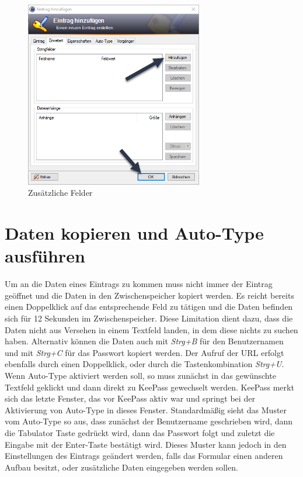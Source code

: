 \documentclass[12pt,a4paper]{scrreprt}
\begin{document}
\begin{figure}[h]
\begin{center}
\includegraphics[width=220pt]{media/knewentry4.png}
\caption{Zusätzliche Felder}
\label{knewentry4}
\end{center}
\end{figure}

\newpage

\section{Daten kopieren und Auto-Type ausführen}
Um an die Daten eines Eintrags zu kommen muss nicht immer der Eintrag geöffnet und die Daten in den Zwischenspeicher kopiert werden. Es reicht bereits einen Doppelklick auf das entsprechende Feld zu tätigen und die Daten befinden sich für 12 Sekunden im Zwischenspeicher. Diese Limitation dient dazu, dass die Daten nicht aus Versehen in einem Textfeld landen, in dem diese nichts zu suchen haben. Alternativ können die Daten auch mit \textit{Strg+B} für den Benutzernamen und mit \textit{Strg+C} für das Passwort kopiert werden. Der Aufruf der URL erfolgt ebenfalls durch einen Doppelklick, oder durch die Tastenkombination \textit{Strg+U}.\\

\noindent Wenn Auto-Type aktiviert werden soll, so muss zunächst in das gewünschte Textfeld geklickt und dann direkt zu KeePass gewechselt werden. KeePass merkt sich das letzte Fenster, das vor KeePass aktiv war und springt bei der Aktivierung von Auto-Type in dieses Fenster. Standardmäßig sieht das Muster vom Auto-Type so aus, dass zunächst der Benutzername geschrieben wird, dann die Tabulator Taste gedrückt wird, dann das Passwort folgt und zuletzt die Eingabe mit der Enter-Taste bestätigt wird. Dieses Muster kann jedoch in den Einstellungen des Eintrags geändert werden, falls das Formular einen anderen Aufbau besitzt, oder zusätzliche Daten eingegeben werden sollen.
\end{document}
